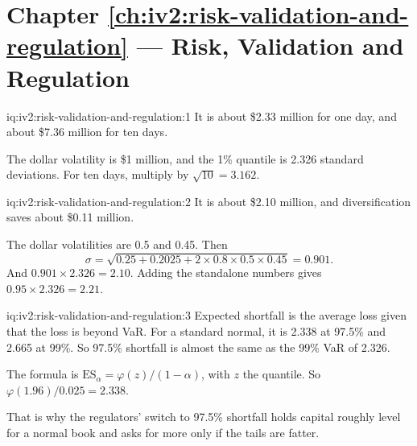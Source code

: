 \section*{Chapter \ref{ch:iv2:risk-validation-and-regulation} --- Risk, Validation and Regulation}

\begin{solution}{iq:iv2:risk-validation-and-regulation:1}
It is about \$2.33 million for one day, and about \$7.36 million for ten days.

The dollar volatility is \$1 million, and the 1\% quantile is 2.326 standard deviations. For ten days, multiply by $\sqrt{10} = 3.162$.

\end{solution}

\begin{solution}{iq:iv2:risk-validation-and-regulation:2}
It is about \$2.10 million, and diversification saves about \$0.11 million.

The dollar volatilities are 0.5 and 0.45. Then
\[
\sigma = \sqrt{0.25 + 0.2025 + 2 \times 0.8 \times 0.5 \times 0.45} = 0.901.
\]
And $0.901 \times 2.326 = 2.10$. Adding the standalone numbers gives $0.95 \times 2.326 = 2.21$.

\end{solution}

\begin{solution}{iq:iv2:risk-validation-and-regulation:3}
Expected shortfall is the average loss given that the loss is beyond VaR. For a standard normal, it is 2.338 at 97.5\% and 2.665 at 99\%. So 97.5\% shortfall is almost the same as the 99\% VaR of 2.326.

The formula is $\mathrm{ES}_{\alpha} = \varphi(z)/(1 - \alpha)$, with $z$ the quantile. So $\varphi(1.96)/0.025 = 2.338$.

That is why the regulators' switch to 97.5\% shortfall holds capital roughly level for a normal book and asks for more only if the tails are fatter.

\end{solution}

